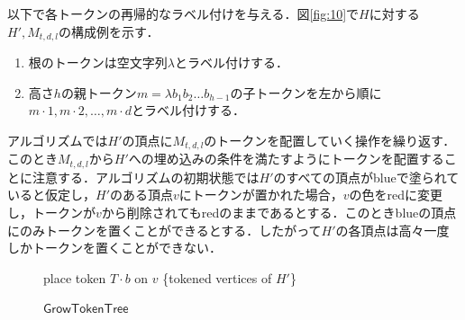 \documentclass[master]{kuisthesis}		%
\theoremstyle{plain}
\theoremstyle{definition}
\begin{document}
以下で各トークンの再帰的なラベル付けを与える．図\ref{fig:10}で$H$に対する$H', M_{t, d, l}$の構成例を示す．

\begin{enumerate}
    \item 根のトークンは空文字列$\lambda$とラベル付けする．
    \item 高さ$h$の親トークン$m=\lambda b_1 b_2 \dots b_{h-1}$の子トークンを左から順に$m \cdot 1, m \cdot 2, \dots , m \cdot d$とラベル付けする．
\end{enumerate}

アルゴリズムでは$H'$の頂点に$M_{t, d, l}$のトークンを配置していく操作を繰り返す．このとき$M_{t, d, l}$から$H'$への埋め込みの条件を満たすようにトークンを配置することに注意する．アルゴリズムの初期状態では$H'$のすべての頂点がblueで塗られていると仮定し，$H'$のある頂点$v$にトークンが置かれた場合，$v$の色をredに変更し，トークンが$v$から削除されてもredのままであるとする．このときblueの頂点にのみトークンを置くことができるとする．したがって$H'$の各頂点は高々一度しかトークンを置くことができない．






\begin{figure}[!t]
\begin{algorithm}[H]
	\caption{$\mathsf{GrowTokenTree}$}
	\label{growtokentree}
	\begin{algorithmic}[1]
    \STATE place token $T \cdot b$ on $v$
    \ENDWHILE
    \RETURN \{tokened vertices of $H'$\}
	\end{algorithmic}
\end{algorithm}
\end{figure}
\end{document}
